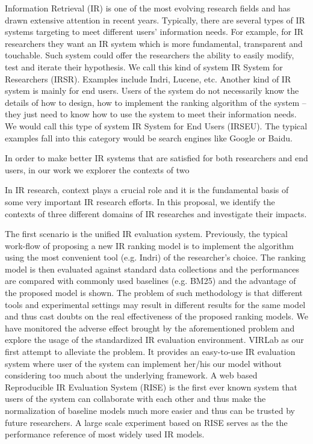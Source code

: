 %
%
Information Retrieval (IR) is one of the most evolving research fields 
and has drawn extensive attention in recent years. 
Typically, there are several types of IR systems targeting to meet different 
users' information needs. 
For example, for IR researchers they want an IR system which is more 
fundamental, transparent and touchable. Such system could offer the researchers 
the ability to easily modify, test and iterate their hypothesis. 
We call this kind of system IR System for Researchers (IRSR). Examples 
include Indri, Lucene, etc.
Another kind of IR system is mainly for end users. Users of the system 
do not necessarily know the details of how to design, how to implement the 
ranking algorithm of the system -- they just need to know how to use the 
system to meet their information needs.
We would call this type of system IR System for End Users (IRSEU). 
The typical examples fall into this category would be search engines like 
Google or Baidu.

In order to make better IR systems that are satisfied for both researchers 
and end users, in our work we explorer the contexts of two 

In IR research, context plays a crucial role and it is the fundamental basis 
of some very important IR research efforts.
In this proposal, we identify the contexts of three different domains 
of IR researches and investigate their impacts. 

The first scenario is the unified IR evaluation system. 
Previously, the typical work-flow of proposing a new IR ranking model is to 
implement the algorithm using the most convenient tool (e.g. Indri) of the researcher's choice. 
The ranking model is then evaluated against standard 
data collections and the performances are compared with commonly used 
baselines (e.g. BM25) and the advantage of the proposed model is shown. 
The problem of such methodology is that different tools and experimental 
settings may result in different results for the same model and thus cast 
doubts on the real effectiveness of the proposed ranking models. 
We have monitored the adverse effect brought by the aforementioned problem and 
explore the usage of the standardized IR evaluation environment. 
VIRLab as our first attempt to alleviate the problem. It provides an 
easy-to-use IR evaluation system where user of the system can implement 
her/his our model without considering too much about the underlying framework. 
A web based Reproducible IR Evaluation System (RISE) is the first ever known 
system that users of the system can collaborate with each other and thus make 
the normalization of baseline models much more easier and thus can be trusted 
by future researchers. A large scale experiment based on RISE serves as the 
the performance reference of most widely used IR models.

